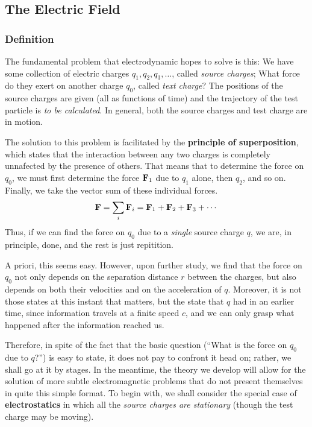 
\subsection{The Electric Field}
	\subsubsection{Definition}
		The fundamental problem that electrodynamic hopes to solve is this:
		We have some collection of electric charges $q_1,q_2,q_3,\ldots$, called
		\textit{source charges}; What force do they exert on another charge $q_0$, called
		\textit{text charge}? The positions of the source charges are given (all as functions of time)
		and the trajectory of the test particle is \textit{to be calculated}. In general,
		both the source charges and test charge are in motion.

		The solution to this problem is facilitated by the \textbf{principle of superposition},
		which states that the interaction between any two charges is completely unnafected by
		the presence of others. That means that to determine the force on $q_0$, we must first 
		determine the force $\vb{F}_1$ due to $q_1$ alone, then $q_2$, and so on. Finally, we take 
		the vector sum of these individual forces.
		\[
			\vb{F} = \sum_i \vb{F}_i = \vb{F}_1 + \vb{F}_2 + \vb{F}_3 + \cdots
		\]
		Thus, if we can find the force on $q_0$ due to a \textit{single} source charge $q$, we 
		are, in principle, done, and the rest is just repitition.

		A priori, this seems easy. However, upon further study, we find that the force on $q_0$
		not only depends on the separation distance $r$ between the charges, but also depends on
		both their velocities and on the acceleration of $q$. Moreover, it is not those states 
		at this instant that matters, but the state that $q$ had in an earlier time, since information
		travels at a finite speed $c$, and we can only grasp what happened after the information reached 
		us.

		Therefore, in spite of the fact that the basic question (``What is the force on
		$q_0$ due to $q$?'') is easy to state, it does not pay to confront it head on; rather, we
		shall go at it by stages. In the meantime, the theory we develop will allow for the
		solution of more subtle electromagnetic problems that do not present themselves
		in quite this simple format. To begin with, we shall consider the special case
		of \textbf{electrostatics} in which all the \textit{source charges are stationary} (though the test
		charge may be moving).
